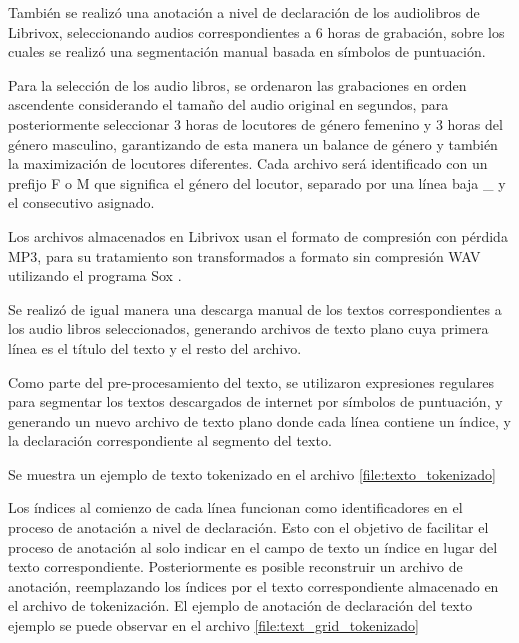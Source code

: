 También se realizó una anotación a nivel de declaración de los audiolibros de Librivox, seleccionando audios correspondientes a 6 horas de grabación, sobre los cuales se realizó una segmentación manual basada en símbolos de puntuación.

Para la selección de los audio libros, se ordenaron las grabaciones en orden ascendente considerando el tamaño del audio original en segundos, para posteriormente seleccionar 3 horas de locutores de género femenino y 3 horas del género masculino, garantizando de esta manera un balance de género y también la maximización de locutores diferentes. Cada archivo será identificado con un prefijo F o M que significa el género del locutor, separado por una línea baja \_ y el consecutivo asignado.

Los archivos almacenados en Librivox usan el formato de compresión con pérdida MP3, para su tratamiento son transformados a formato sin compresión WAV utilizando el programa Sox \cite{Sox}.

Se realizó de igual manera una descarga manual de los textos correspondientes a los audio libros seleccionados, generando archivos de texto plano cuya primera línea es el título del texto y el resto del archivo.

Como parte del pre-procesamiento del texto, se utilizaron expresiones regulares para segmentar los textos descargados de internet por símbolos de puntuación, y generando un nuevo archivo de texto plano donde cada línea contiene un índice, y la declaración correspondiente al segmento del texto.

Se muestra un ejemplo de texto tokenizado en el archivo \ref{file:texto_tokenizado}



Los índices al comienzo de cada línea funcionan como identificadores en el proceso de anotación a nivel de declaración. Esto con el objetivo de facilitar el proceso de anotación al solo indicar en el campo de texto un índice en lugar del texto correspondiente. Posteriormente es posible reconstruir un archivo de anotación, reemplazando los índices por el texto correspondiente almacenado en el archivo de tokenización. El ejemplo de anotación de declaración del texto ejemplo se puede observar en el archivo \ref{file:text_grid_tokenizado}




